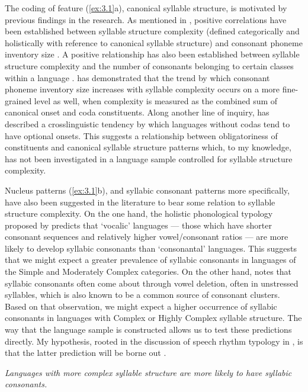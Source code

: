   The coding of feature (\ref{ex:3.1}a), canonical syllable structure, is motivated by previous findings in the research. As mentioned in , positive correlations have been established between syllable structure complexity (defined categorically and holistically with reference to canonical syllable structure) and consonant phoneme inventory size \citep{Maddieson2013a}. A positive relationship has also been established between syllable structure complexity and the number of consonants belonging to certain classes within a language \citep{MaddiesonEtAl2013}. \citet{Gordon2016} has demonstrated that the trend by which consonant phoneme inventory size increases with syllable complexity occurs on a more fine-grained level as well, when complexity is measured as the combined sum of canonical onset and coda constituents. Along another line of inquiry, \citet[336]{Blevins2006} has described a crosslinguistic tendency by which languages without codas tend to have optional onsets. This suggests a relationship between obligatoriness of constituents and canonical syllable structure patterns which, to my knowledge, has not been investigated in a language sample controlled for syllable structure complexity.

  Nucleus patterns (\ref{ex:3.1}b), and syllabic consonant patterns more specifically, have also been suggested in the literature to bear some relation to syllable structure complexity. On the one hand, the holistic phonological typology proposed by \citet{Isačenko1939/1940} predicts that ‘vocalic’ languages — those which have shorter consonant sequences and relatively higher vowel/consonant ratios — are more likely to develop syllabic consonants than ‘consonantal’ languages. This suggests that we might expect a greater prevalence of syllabic consonants in languages of the Simple and Moderately Complex categories. On the other hand, \citet{Bell1978a} notes that syllabic consonants often come about through vowel deletion, often in unstressed syllables, which is also known to be a common source of consonant clusters. Based on that observation, we might expect a higher occurrence of syllabic consonants in languages with Complex or Highly Complex syllable structure. The way that the language sample is constructed allows us to test these predictions directly. My hypothesis, rooted in the discussion of speech rhythm typology in , is that the latter prediction will be borne out .

\ea\label{ex:3.3}
   \textit{Languages with more complex syllable structure are more likely to have syllabic consonants.}
\z

